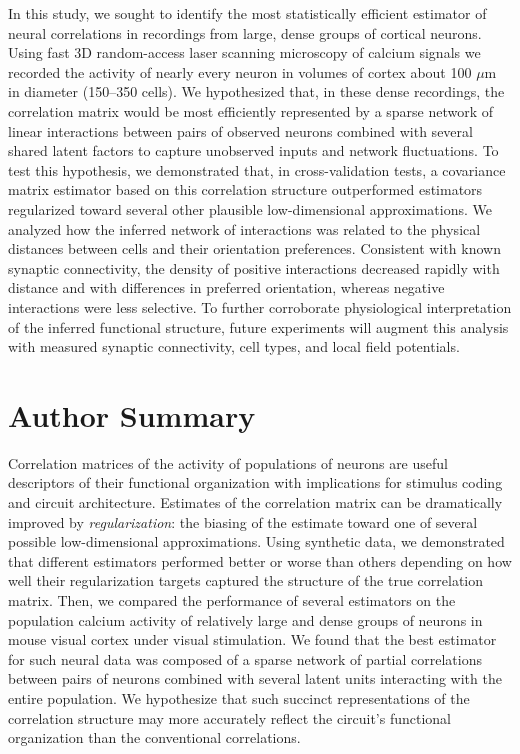 \documentclass[10pt]{article}
\begin{document}
In this study, we sought to identify the most statistically efficient estimator of neural correlations in recordings from large, dense groups of cortical neurons.  Using fast 3D random-access laser scanning microscopy of calcium signals we recorded the activity of nearly every neuron in volumes of cortex about 100 $\mu$m in diameter (150--350 cells).  We hypothesized that, in these dense recordings, the correlation matrix would be most efficiently represented by a sparse network of linear interactions between pairs of observed neurons combined with several shared latent factors to capture unobserved inputs and network fluctuations.  To test this hypothesis, we demonstrated that, in cross-validation tests, a covariance matrix estimator based on this correlation structure outperformed estimators regularized toward several other plausible low-dimensional approximations. We analyzed how the inferred network of interactions was related to the physical distances between cells and their orientation preferences.  Consistent with known synaptic connectivity, the density of positive interactions decreased rapidly with distance and with differences in preferred orientation, whereas negative interactions were less selective.  To further corroborate physiological interpretation of the inferred functional structure, future experiments will augment this analysis with measured synaptic connectivity, cell types, and local field potentials.

\section*{Author Summary}
Correlation matrices of the activity of populations of neurons are useful descriptors of their functional organization with implications for stimulus coding and circuit architecture.  Estimates of the correlation matrix can be dramatically improved by \emph{regularization}: the biasing of the estimate toward one of several possible low-dimensional approximations.  Using synthetic data, we demonstrated that different estimators performed better or worse than others depending on how well their regularization targets captured the structure of the true correlation matrix.  Then, we compared the performance of several estimators on the population calcium activity of relatively large and dense groups of neurons in mouse visual cortex under visual stimulation.  We found that the best estimator for such neural data was composed of a sparse network of partial correlations between pairs of neurons combined with several latent units interacting with the entire population. We hypothesize that such succinct representations of the correlation structure may more accurately reflect the circuit's functional organization than the conventional correlations.  
\end{document}
